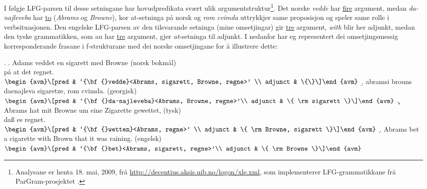 \documentclass[11pt,a4paper,oneside,draft]{book}
\begin{document}
I følgje LFG-parsen til desse setningane har hovudpredikata svært ulik
argumentstruktur\footnote{Analysane er henta 18. mai, 2009, frå
        \href{http://decentius.aksis.uib.no/logon/xle.xml}{http://decentius.aksis.uib.no/logon/xle.xml}, som implementerer
        LFG-grammatikkane frå ParGram-prosjektet \citep{butt2002pgp}. }. Det norske \emph{vedde} har \underline{fire} argument, medan
\emph{da-najleveba} har \underline{to} (\emph{Abrams} og \emph{Browne}), kor at-setninga på
norsk og \emph{rom cvimda} uttrykkjer same proposisjon og speler same rolle
i verbsituasjonen. Den engelske LFG-parsen av den tilsvarande setninga
(mine omsetjingar) gir \underline{tre} argument, \emph{with} blir her adjunkt, medan
den tyske grammatikken, som au har \underline{tre} argument, gjer \emph{at}-setninga
til adjunkt. I \Next nedanfor har eg representert dei omsetjingsmessig
korresponderande frasane i f-strukturane med dei norske omsetjingane
for å illustrere dette:

{\avmoptions{}
\ex. \label{vedde}
\a. Adams veddet en sigarett med Browne \hfill{} (norsk bokmål)\\ på at det regnet.\\
    $\\\begin{avm}\[pred & `{\bf{}vedde}<Abrams, sigarett, Browne, regne>' \\
                 adjunct & \{\}\]\end{avm}\\$
\b. abramsi brouns daenajleva sigaretze, rom cvimda. \hfill{} (georgisk)\\
    $\\\begin{avm}\[pred &  `{\bf{}da-najleveba}<Abrams, Browne, regne>'\\
    adjunct &  \{ \rm sigarett \}\]\end{avm}\\$ 
\c. Abrams hat mit Browne um eine Zigarette gewettet, \hfill{}(tysk)\\
    daß es regnet.\\
    $\\\begin{avm}\[pred & `{\bf{}wetten}<Abrams, regne>' \\
                  adjunct & \{ \rm Browne, sigarett \}\]\end{avm}\\$
\d. Abrams bet a cigarette with Brown that it was raining. \hfill{}(engelsk)\\
    $\\\begin{avm}\[pred & `{\bf{}bet}<Abrams, sigarett, regne>'\\
                  adjunct & \{ \rm Browne \}\]\end{avm}$

}
\end{document}
